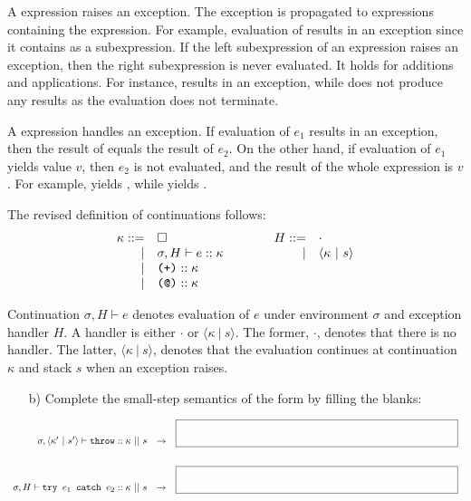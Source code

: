 \begin{enumerate}
A  expression raises an exception. The exception is propagated to
expressions containing the  expression. For example, evaluation of
 results in an exception since it contains  as
a subexpression. If the left subexpression of an expression raises an exception,
then the right subexpression is never evaluated. It holds for additions and
applications. For instance, 
results in an exception, while 
does not produce any results as the evaluation does not terminate.

A  expression
handles an exception. If evaluation of $e_1$ results in an exception, then
the result of  equals the result of
$e_2$. On the other hand, if evaluation of $e_1$ yields value $v$, then
$e_2$ is not evaluated, and the result of the whole expression is $v$.
For example,  yields , while
 yields .

The revised definition of continuations follows:
\[
\begin{array}{rllrll}
\kappa ::= & \square &\qquad& H::= & \cdot \\
\mid& \sigma,H\vdash e::\kappa &&\mid& \langle \kappa\ |\ s\rangle \\
\mid& \verb!(+)!::\kappa \\
\mid& \verb+(@)+::\kappa \\
\end{array}
\]

Continuation $\sigma,H\vdash e$ denotes evaluation of $e$ under
environment $\sigma$ and exception handler $H$.
A handler is either $\cdot$ or $\langle \kappa\ |\ s\rangle$.
The former, $\cdot$, denotes that there is no handler.
The latter, $\langle \kappa\ |\ s\rangle$, denotes that the evaluation
continues at continuation $\kappa$ and stack $s$ when
an exception raises.

\begin{itemize}
\item[b)] Complete the small-step semantics
of the form 
by filling the blanks:

\end{itemize}
\[
\begin{array}{rcl}
\sigma,\langle\kappa'\ |\ s'\rangle\vdash \code{throw}::\kappa\ ||\ s
&\rightarrow& \mblank\\[20pt]
\sigma,H\vdash \code{try }e_1\code{ catch }e_2::\kappa\ ||\ s
&\rightarrow& \mblank\\[20pt]
\end{array}
\]


\end{enumerate}
